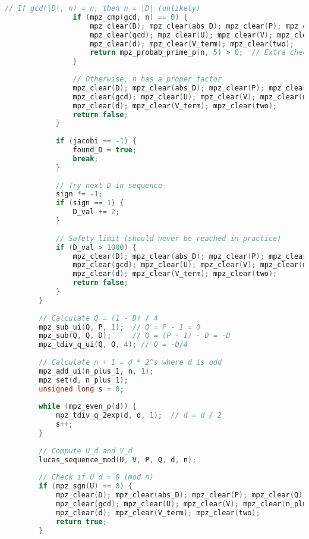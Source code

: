 \begin{lstlisting}[language=C++, caption=Baillie-PSW Test Implementation]
                // If gcd(|D|, n) = n, then n = |D| (unlikely)
                if (mpz_cmp(gcd, n) == 0) {
                    mpz_clear(D); mpz_clear(abs_D); mpz_clear(P); mpz_clear(Q);
                    mpz_clear(gcd); mpz_clear(U); mpz_clear(V); mpz_clear(n_plus_1);
                    mpz_clear(d); mpz_clear(V_term); mpz_clear(two);
                    return mpz_probab_prime_p(n, 5) > 0;  // Extra check
                }
                
                // Otherwise, n has a proper factor
                mpz_clear(D); mpz_clear(abs_D); mpz_clear(P); mpz_clear(Q);
                mpz_clear(gcd); mpz_clear(U); mpz_clear(V); mpz_clear(n_plus_1);
                mpz_clear(d); mpz_clear(V_term); mpz_clear(two);
                return false;
            }
            
            if (jacobi == -1) {
                found_D = true;
                break;
            }
            
            // Try next D in sequence
            sign *= -1;
            if (sign == 1) {
                D_val += 2;
            }
            
            // Safety limit (should never be reached in practice)
            if (D_val > 1000) {
                mpz_clear(D); mpz_clear(abs_D); mpz_clear(P); mpz_clear(Q);
                mpz_clear(gcd); mpz_clear(U); mpz_clear(V); mpz_clear(n_plus_1);
                mpz_clear(d); mpz_clear(V_term); mpz_clear(two);
                return false;
            }
        }
        
        // Calculate Q = (1 - D) / 4
        mpz_sub_ui(Q, P, 1);  // Q = P - 1 = 0
        mpz_sub(Q, Q, D);     // Q = (P - 1) - D = -D
        mpz_tdiv_q_ui(Q, Q, 4); // Q = -D/4
        
        // Calculate n + 1 = d * 2^s where d is odd
        mpz_add_ui(n_plus_1, n, 1);
        mpz_set(d, n_plus_1);
        unsigned long s = 0;
        
        while (mpz_even_p(d)) {
            mpz_tdiv_q_2exp(d, d, 1);  // d = d / 2
            s++;
        }
        
        // Compute U_d and V_d
        lucas_sequence_mod(U, V, P, Q, d, n);
        
        // Check if U_d = 0 (mod n)
        if (mpz_sgn(U) == 0) {
            mpz_clear(D); mpz_clear(abs_D); mpz_clear(P); mpz_clear(Q);
            mpz_clear(gcd); mpz_clear(U); mpz_clear(V); mpz_clear(n_plus_1);
            mpz_clear(d); mpz_clear(V_term); mpz_clear(two);
            return true;
        }
        

\end{lstlisting}
